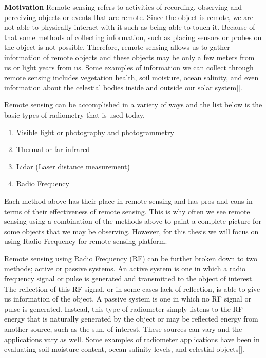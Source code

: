 \textbf{Motivation}
Remote sensing refers to activities of recording, observing and perceiving objects or events that are remote.  Since the object is remote, we are not able to physically interact with it such as being able to touch it.  Because of that some methods of collecting information, such as placing sensors or probes on the object is not possible.  Therefore, remote sensing allows us to gather information of remote objects and these objects may be only a few meters from us or light years from us.  Some examples of information we can collect through remote sensing includes vegetation health, soil moisture, ocean salinity, and even information about the celestial bodies inside and outside our solar system[\cite{weng2012}].  

Remote sensing can be accomplished in a variety of ways and the list below is the basic types of radiometry that is used today.

\begin{enumerate}
\item Visible light or photography and photogrammetry
\item Thermal or far infrared 
\item Lidar (Laser distance measurement)
\item Radio Frequency 
\end{enumerate}

Each method above has their place in remote sensing and has pros and cons in terms of their effectiveness of remote sensing.  This is why often we see remote sensing using a combination of the methods above to paint a complete picture for some objects that we may be observing.  However, for this thesis we will focus on using Radio Frequency for remote sensing platform.

Remote sensing using Radio Frequency (RF) can be further broken down to two methods; active or passive systems.  An active system is one in which a radio frequency signal or pulse is generated and transmitted to the object of interest.  The reflection of this RF signal, or in some cases lack of reflection, is able to give us information of the object.  A passive system is one in which no RF signal or pulse is generated.  Instead, this type of radiometer simply listens to the RF energy that is naturally generated by the object or may be reflected energy from another source, such as the sun. of interest.  These sources can vary and the applications vary as well.  Some examples of radiometer applications have been in evaluating soil moisture content, ocean salinity levels, and celestial objects[\cite{ulaby2014}].

